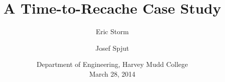 \documentclass[pageno]{jpaper}
\begin{document}
\title{A Time-to-Recache Case Study}

\author{Eric Storm \and Josef Spjut}
\date{Department of Engineering, Harvey Mudd College\\March 28, 2014}
\maketitle


\begin{abstract}

\end{abstract}











\end{document}
